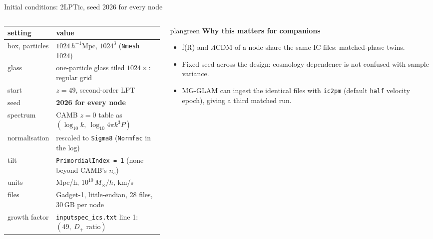 \documentclass[UTF8]{beamer}
\newcommand{\Mpch}{\,h^{-1}\mathrm{Mpc}}
\begin{document}
\begin{frame}{Initial conditions: 2LPTic, seed 2026 for every node}
  \footnotesize
  \begin{columns}[T,totalwidth=\textwidth]
    \begin{column}{0.5\textwidth}
      \scriptsize
      \setlength{\tabcolsep}{3pt}
      \begin{tabular}{@{}ll@{}}
        \toprule
        setting & value \\
        \midrule
        box, particles & $1024\Mpch$, $1024^3$ (\texttt{Nmesh} 1024) \\
        glass & one-particle glass tiled $1024\times$: regular grid \\
        start & $z = 49$, second-order LPT \\
        seed & \textbf{2026 for every node} \\
        spectrum & CAMB $z{=}0$ table as $(\log_{10}k,\ \log_{10}4\pi k^3P)$ \\
        normalisation & rescaled to \texttt{Sigma8} (\texttt{Normfac} in the log) \\
        tilt & \texttt{PrimordialIndex = 1} (none beyond CAMB's $n_s$) \\
        units & Mpc/h, $10^{10}\,M_\odot/h$, km/s \\
        files & Gadget-1, little-endian, 28 files, 30\,GB per node \\
        growth factor & \texttt{inputspec\_ics.txt} line 1: $(49,\ D_+ \text{ ratio})$ \\
        \bottomrule
      \end{tabular}
    \end{column}
    \hfill
    \begin{column}{0.47\textwidth}
      \begin{phasebox}[colback=plangreen!6]{plangreen}
        {\color{plangreen}\bfseries Why this matters for companions}\par\smallskip
        \scriptsize
        \begin{itemize}\setlength\itemsep{0.2em}
          \item f(R) and $\Lambda$CDM of a node share the same IC files: matched-phase twins.
          \item Fixed seed across the design: cosmology dependence is not confused with sample variance.
          \item MG-GLAM can ingest the identical files with \texttt{ic2pm} (default \texttt{half} velocity epoch), giving a third matched run.

\end{itemize}
\end{phasebox}
\end{column}
\end{columns}
\end{frame}
\end{document}
